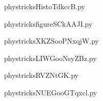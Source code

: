     \newcommand{\CaptionFigHistoTdkccB}{<+Type your caption here+>}
    \begin{center}
        
    \end{center}
    phystricksHistoTdkccB.py

    

    \clearpage
    


    \newcommand{\CaptionFigfigureSCkAAJI}{<+Type your caption here+>}
    \begin{center}
        
    \end{center}
    phystricksfigureSCkAAJI.py

    

    \clearpage
    


    \newcommand{\CaptionFigXKZSooPNxqjW}{<+Type your caption here+>}
    \begin{center}
        
    \end{center}
    phystricksXKZSooPNxqjW.py

    

    \clearpage
    


    \newcommand{\CaptionFigLIWGooNsyZBz}{<+Type your caption here+>}
    \begin{center}
        
    \end{center}
    phystricksLIWGooNsyZBz.py

    

    \clearpage
    


    \newcommand{\CaptionFigRVZNtGK}{<+Type your caption here+>}
    \begin{center}
        
    \end{center}
    phystricksRVZNtGK.py

    

    \clearpage
    


    \newcommand{\CaptionFigNUEGooGTqxcl}{<+Type your caption here+>}
    \begin{center}
        
    \end{center}
    phystricksNUEGooGTqxcl.py

